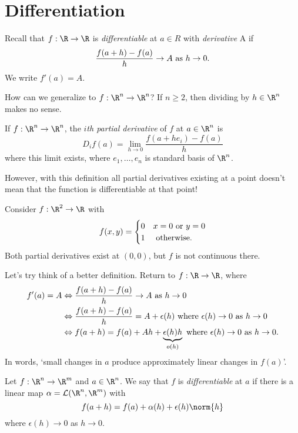 \section{Differentiation}
Recall that $f:\R\to \R$ is \emph{differentiable} at $a\in R$ with \emph{derivative} A if \[ \frac{f(a+h)-f(a)}{h}\to A \textup{ as } h\to 0.\] We write $f'(a) = A$.

How can we generalize to $f:\R^n\to \R^n$? If $n\geq 2$, then dividing by $h\in \R^n$ makes no sense.

\begin{definition}
If $f: \R^n\to \R^n$, the \emph{$i$th partial derivative} of $f$ at $a\in \R^n$ is \[ D_i f(a) = \lim_{h\to 0} \frac{f(a+he_i)-f(a)}{h}\]
where this limit exists, where $e_1,\dots ,e_n$ is standard basis of $\R^n$.
\end{definition}

However, with this definition all partial derivatives existing at a point doesn't mean that the function is differentiable at that point!
\begin{example}
Consider $f:\R^2\to \R$ with 
\[
f(x,y) = \begin{cases}
0 & x = 0 \textup{ or } y = 0\\
1 & \textup{ otherwise.}
\end{cases}
\]
Both partial derivatives exist at $(0,0)$, but $f$ is not continuous there.
\end{example}

Let's try think of a better definition. Return to $f:\R\to \R$, where
\begin{align*}
    f'(a) = A &\Leftrightarrow \frac{f(a+h) - f(a)}{h}\to A \textup{ as }h\to 0\\
    &\Leftrightarrow \frac{f(a+h) - f(a)}{h} = A+\epsilon(h) \textup{ where } \epsilon(h)\to 0 \textup{ as } h\to 0\\
    &\Leftrightarrow f(a+h) = f(a) + Ah + \underbrace{\epsilon(h)h}_{o(h)} \textup{ where } \epsilon(h)\to 0 \textup{ as } h\to 0.
\end{align*}
In words, `small changes in $a$ produce approximately linear changes in $f(a)$'.

\begin{definition}
Let $f:\R^n\to \R^m$ and $a\in \R^n$. We say that $f$ is \emph{differentiable} at $a$ if there is a linear map $\alpha = \mathcal{L}(\R^n,\R^m)$ with \[ f(a+h) = f(a) + \alpha(h) + \epsilon(h) \norm{h}\] where $\epsilon(h)\to 0$ as $h\to 0$.
\end{definition}

